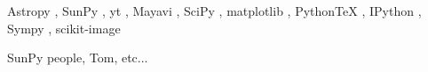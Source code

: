 
\begin{acknowledgements}      



Astropy \cite{theastropycollaboration2013}, SunPy \cite{thesunpycommunity2015a}, yt \cite{turk2011}, Mayavi \cite{ramachandran2011}, SciPy \cite{jones2001}, matplotlib \cite{hunter2007}, PythonTeX \cite{poore2013}, IPython \cite{perez2007}, Sympy \cite{sympydevelopmentteam2014}, scikit-image \cite{vanderwalt2014}



SunPy people, Tom, etc...


\end{acknowledgements}
